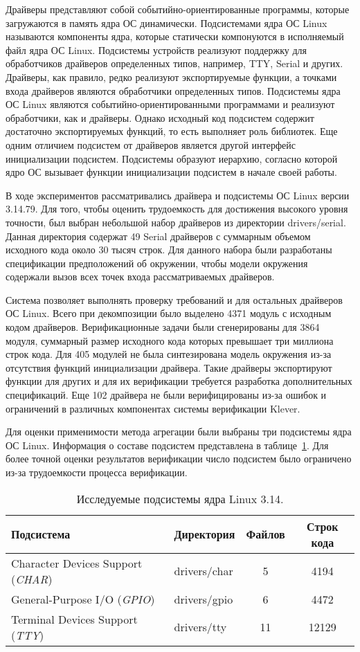 Драйверы представляют собой событийно-ориентированные программы, которые загружаются в память ядра ОС динамически.
Подсистемами ядра ОС Linux называются компоненты ядра, которые статически компонуются в исполняемый файл ядра ОС Linux.
Подсистемы устройств реализуют поддержку для обработчиков драйверов определенных типов, например, TTY, Serial и других.
Драйверы, как правило, редко реализуют экспортируемые функции, а точками входа драйверов являются обработчики определенных типов.
Подсистемы ядра ОС Linux являются событийно-ориентированными программами и реализуют обработчики, как и драйверы.
Однако исходный код подсистем содержит достаточно экспортируемых функций, то есть выполняет роль библиотек.
Еще одним отличием подсистем от драйверов является другой интерфейс инициализации подсистем.
Подсистемы образуют иерархию, согласно которой ядро ОС вызывает функции инициализации подсистем в начале своей работы.

В ходе экспериментов рассматривались драйвера и подсистемы ОС Linux версии 3.14.79.
Для того, чтобы оценить трудоемкость для достижения высокого уровня точности, был выбран небольшой набор драйверов из директории drivers/serial.
Данная директория содержат 49 Serial драйверов с суммарным объемом исходного кода около 30 тысяч строк.
Для данного набора были разработаны спецификации предположений об окружении, чтобы модели окружения содержали вызов всех точек входа рассматриваемых драйверов.

Система позволяет выполнять проверку требований и для остальных драйверов ОС Linux.
Всего при декомпозиции было выделено 4371 модуль с исходным кодом драйверов.
Верификационные задачи были сгенерированы для 3864 модуля, суммарный размер исходного кода которых превышает три миллиона строк кода.
Для 405 модулей не была синтезирована модель окружения из-за отсутствия функций инициализации драйвера.
Такие драйверы экспортируют функции для других и для их верификации требуется разработка дополнительных спецификаций.
Еще 102 драйвера не были верифицированы из-за ошибок и ограничений в различных компонентах системы верификации Klever.

Для оценки применимости метода агрегации были выбраны три подсистемы ядра ОС Linux.
Информация о составе подсистем представлена в таблице~\ref{table:target_subsystems}.
Для более точной оценки результатов верификации число подсистем было ограничено из-за трудоемкости процесса верификации.

\begin{table}
\centering
\begin{tabular}{| l | l | c | c |}
\hline
Подсистема & Директория & Файлов & Строк кода \\
\hline
Character Devices Support (\textit{CHAR}) & drivers/char & 5 & 4194 \\ 
\hline
General-Purpose I/O (\textit{GPIO}) & drivers/gpio & 6 & 4472 \\ 
\hline
Terminal Devices Support (\textit{TTY}) & drivers/tty & 11 & 12129 \\ 
\hline
\end{tabular}
\caption{Исследуемые подсистемы ядра Linux 3.14.}
\label{table:target_subsystems}
\end{table}

